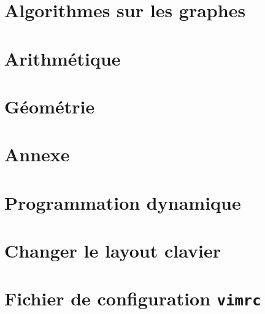 \documentclass[a4paper,10pt]{article}
\begin{document}
\lstset{language=c++}
\lstset{commentstyle=\textit}

\section{Algorithmes sur les graphes}


\clearpage

\clearpage

\clearpage

\clearpage

\clearpage

\clearpage

\clearpage


\clearpage

\clearpage

\section{Arithmétique}


\clearpage

\clearpage

\section{Géométrie}


\clearpage


\section{Annexe}


\clearpage



\section{Programmation dynamique}


\clearpage

\section{Changer le layout clavier}

\lstset{language=sh}


\section{Fichier de configuration \texttt{vimrc}}

\lstset{language=tcl}

\end{document}

